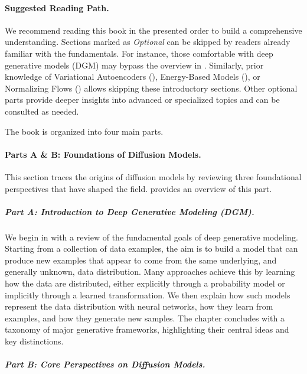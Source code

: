 \paragraph{Suggested Reading Path.}  
We recommend reading this book in the presented order to build a comprehensive understanding. Sections marked as \emph{Optional} can be skipped by readers already familiar with the fundamentals. For instance, those comfortable with deep generative models (DGM) may bypass the overview in . Similarly, prior knowledge of Variational Autoencoders (), Energy-Based Models (), or Normalizing Flows () allows skipping these introductory sections. Other optional parts provide deeper insights into advanced or specialized topics and can be consulted as needed.

The book is organized into four main parts.
\paragraph{Parts A \& B: Foundations of Diffusion Models.}
This section traces the origins of diffusion models by reviewing three foundational perspectives that have shaped the field.  provides an overview of this part.

\subparagraph{Part A: Introduction to Deep Generative Modeling (DGM).}
We begin in  with a review of the fundamental goals of deep generative modeling. Starting from a collection of data examples, the aim is to build a model that can produce new examples that appear to come from the same underlying, and generally unknown, data distribution. Many approaches achieve this by learning how the data are distributed, either explicitly through a probability model or implicitly through a learned transformation. We then explain how such models represent the data distribution with neural networks, how they learn from examples, and how they generate new samples. The chapter concludes with a taxonomy of major generative frameworks, highlighting their central ideas and key distinctions.







\subparagraph{Part B: Core Perspectives on Diffusion Models.}



